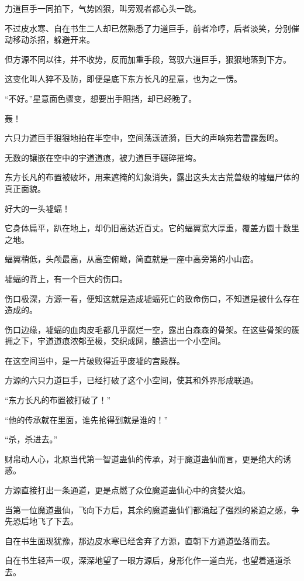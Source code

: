 \begin{this_body}
力道巨手一同拍下，气势凶狠，叫旁观者都心头一跳。

不过皮水寒、自在书生二人却已然熟悉了力道巨手，前者冷哼，后者淡笑，分别催动移动杀招，躲避开来。

但方源不同以往，并不收势，反而加重手段，驾驭六道巨手，狠狠地落到下方。

这变化叫人猝不及防，即便是底下东方长凡的星意，也为之一愣。

“不好。”星意面色骤变，想要出手阻挡，却已经晚了。

轰！

六只力道巨手狠狠地拍在半空中，空间荡漾涟漪，巨大的声响宛若雷霆轰鸣。

无数的镶嵌在空中的宇道道痕，被力道巨手碾碎摧垮。

东方长凡的布置被破坏，用来遮掩的幻象消失，露出这头太古荒兽级的墟蝠尸体的真正面貌。

好大的一头墟蝠！

它身体扁平，趴在地上，却仍旧高达近百丈。它的蝠翼宽大厚重，覆盖方圆十数里之地。

蝠翼稍低，头颅最高，从高空俯瞰，简直就是一座中高旁第的小山峦。

墟蝠的背上，有一个巨大的伤口。

伤口极深，方源一看，便知这就是造成墟蝠死亡的致命伤口，不知道是被什么存在造成的。

伤口边缘，墟蝠的血肉皮毛都几乎腐烂一空，露出白森森的骨架。在这些骨架的簇拥之下，宇道道痕浓郁至极，交织成网，酿造出一个小空间。

在这空间当中，是一片破败得近乎废墟的宫殿群。

方源的六只力道巨手，已经打破了这个小空间，使其和外界形成联通。

“东方长凡的布置被打破了！”

“他的传承就在里面，谁先抢得到就是谁的！”

“杀，杀进去。”

财帛动人心，北原当代第一智道蛊仙的传承，对于魔道蛊仙而言，更是绝大的诱惑。

方源直接打出一条通道，更是点燃了众位魔道蛊仙心中的贪婪火焰。

当第一位魔道蛊仙，飞向下方后，其余的魔道蛊仙们都涌起了强烈的紧迫之感，争先恐后地飞了下去。

自在书生面现犹豫，那边皮水寒已经舍弃了方源，直朝下方通道坠落而去。

自在书生轻声一叹，深深地望了一眼方源后，身形化作一道白光，也望着通道杀去。


\end{this_body}
